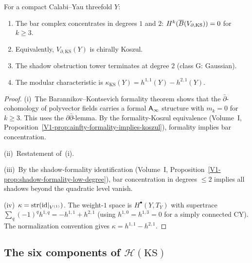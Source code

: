 \begin{theorem}
\label{thm:thqg-ks-koszul-btt}
For a compact Calabi--Yau threefold $Y$:
\begin{enumerate}[label=\textup{(\roman*)}]
\item The bar complex concentrates in degrees $1$ and $2$:
 $H^k(\overline{B}(V_{\partial,\mathrm{KS}})) = 0$ for $k \ge 3$.
\item Equivalently, $V_{\partial,\mathrm{KS}}(Y)$ is chirally Koszul.
\item The shadow obstruction tower terminates at degree $2$ (class G: Gaussian).
\item The modular characteristic is
 $\kappa_{\mathrm{KS}}(Y) = h^{1,1}(Y) - h^{2,1}(Y)$.
\end{enumerate}
\end{theorem}

\begin{proof}
(i)~The Barannikov--Kontsevich formality theorem shows that the
$\bar\partial$-cohomology of polyvector fields carries a formal
$\mathsf{A}_{\infty}$ structure with $m_k = 0$ for $k \ge 3$. This uses the
$\partial\bar\partial$-lemma. By the formality-Koszul equivalence
(Volume~I, Proposition~\ref{V1-prop:ainfty-formality-implies-koszul}),
formality implies bar concentration.

(ii)~Restatement of~(i).

(iii)~By the shadow-formality identification
(Volume~I, Proposition~\ref{V1-prop:shadow-formality-low-degree}),
bar concentration in degrees $\le 2$ implies all shadows beyond
the quadratic level vanish.

(iv)~$\kappa = \operatorname{str}(\mathrm{id}|_{V^{(1)}})$. The weight-$1$
space is $H^\bullet(Y, T_Y)$ with supertrace
$\sum_q (-1)^q h^{1,q} = -h^{1,1} + h^{2,1}$ (using $h^{1,0} =
h^{1,3} = 0$ for a simply connected CY). The normalization
convention gives $\kappa = h^{1,1} - h^{2,1}$.
\end{proof}


\subsection{The six components of $\mathcal{H}(\mathrm{KS})$}

